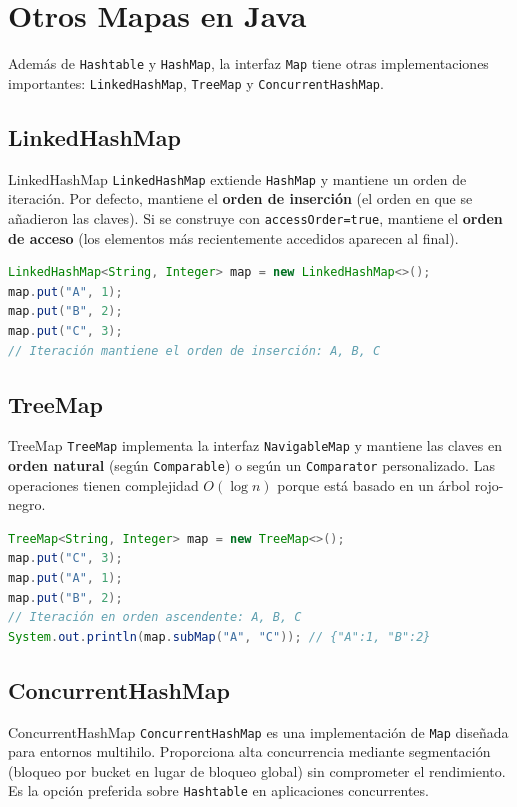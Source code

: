 \section{Otros Mapas en Java}
\label{sec:otros-mapas}

Además de \texttt{Hashtable} y \texttt{HashMap}, la interfaz \texttt{Map} tiene otras implementaciones importantes: \texttt{LinkedHashMap}, \texttt{TreeMap} y \texttt{ConcurrentHashMap}.

\subsection{LinkedHashMap}
\begin{definicion}{LinkedHashMap}
\texttt{LinkedHashMap} extiende \texttt{HashMap} y mantiene un orden de iteración. Por defecto, mantiene el \textbf{orden de inserción} (el orden en que se añadieron las claves). Si se construye con \texttt{accessOrder=true}, mantiene el \textbf{orden de acceso} (los elementos más recientemente accedidos aparecen al final).
\end{definicion}

\begin{lstlisting}[language=Java, style=java, caption={Ejemplo de LinkedHashMap}]
LinkedHashMap<String, Integer> map = new LinkedHashMap<>();
map.put("A", 1);
map.put("B", 2);
map.put("C", 3);
// Iteración mantiene el orden de inserción: A, B, C
\end{lstlisting}

\subsection{TreeMap}
\begin{definicion}{TreeMap}
\texttt{TreeMap} implementa la interfaz \texttt{NavigableMap} y mantiene las claves en \textbf{orden natural} (según \texttt{Comparable}) o según un \texttt{Comparator} personalizado. Las operaciones tienen complejidad \(O(\log n)\) porque está basado en un árbol rojo-negro.
\end{definicion}

\begin{lstlisting}[language=Java, style=java, caption={Ejemplo de TreeMap}]
TreeMap<String, Integer> map = new TreeMap<>();
map.put("C", 3);
map.put("A", 1);
map.put("B", 2);
// Iteración en orden ascendente: A, B, C
System.out.println(map.subMap("A", "C")); // {"A":1, "B":2}
\end{lstlisting}

\subsection{ConcurrentHashMap}
\begin{definicion}{ConcurrentHashMap}
\texttt{ConcurrentHashMap} es una implementación de \texttt{Map} diseñada para entornos multihilo. Proporciona alta concurrencia mediante segmentación (bloqueo por bucket en lugar de bloqueo global) sin comprometer el rendimiento. Es la opción preferida sobre \texttt{Hashtable} en aplicaciones concurrentes.
\end{definicion}


